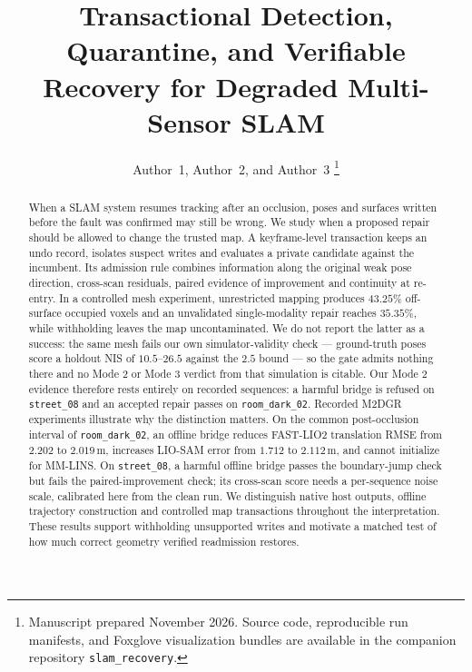 \documentclass[journal]{IEEEtran}
\begin{document}
\title{Transactional Detection, Quarantine, and Verifiable Recovery for Degraded Multi-Sensor SLAM}

\author{Author~1, Author~2, and Author~3%
\thanks{Manuscript prepared November 2026. Source code, reproducible run manifests, and Foxglove visualization bundles are available in the companion repository \texttt{slam\_recovery}.}}

\maketitle

\begin{abstract}
When a SLAM system resumes tracking after an occlusion, poses and surfaces written before the fault was confirmed may still be wrong. We study when a proposed repair should be allowed to change the trusted map. A keyframe-level transaction keeps an undo record, isolates suspect writes and evaluates a private candidate against the incumbent. Its admission rule combines information along the original weak pose direction, cross-scan residuals, paired evidence of improvement and continuity at re-entry. In a controlled mesh experiment, unrestricted mapping produces $43.25\%$ off-surface occupied voxels and an unvalidated single-modality repair reaches $35.35\%$, while withholding leaves the map uncontaminated. We do not report the latter as a success: the same mesh fails our own simulator-validity check --- ground-truth poses score a holdout NIS of $10.5$--$26.5$ against the $2.5$ bound --- so the gate admits nothing there and no Mode 2 or Mode 3 verdict from that simulation is citable. Our Mode 2 evidence therefore rests entirely on recorded sequences: a harmful bridge is refused on \texttt{street\_08} and an accepted repair passes on \texttt{room\_dark\_02}. Recorded M2DGR experiments illustrate why the distinction matters. On the common post-occlusion interval of \texttt{room\_dark\_02}, an offline bridge reduces FAST-LIO2 translation RMSE from $2.202$ to $2.019$\,m, increases LIO-SAM error from $1.712$ to $2.112$\,m, and cannot initialize for MM-LINS. On \texttt{street\_08}, a harmful offline bridge passes the boundary-jump check but fails the paired-improvement check; its cross-scan score needs a per-sequence noise scale, calibrated here from the clean run. We distinguish native host outputs, offline trajectory construction and controlled map transactions throughout the interpretation. These results support withholding unsupported writes and motivate a matched test of how much correct geometry verified readmission restores.
\end{abstract}
\end{document}

